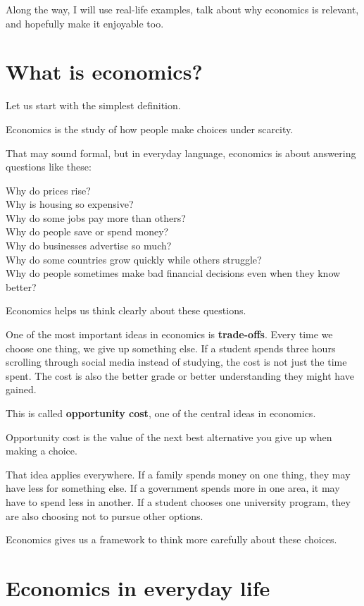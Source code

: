 \documentclass[12pt]{article}
\begin{document}
Along the way, I will use real-life examples, talk about why economics is relevant, and hopefully make it enjoyable too.

\section*{What is economics?}

Let us start with the simplest definition.

Economics is the study of how people make choices under scarcity.

That may sound formal, but in everyday language, economics is about answering questions like these:

Why do prices rise?\\
Why is housing so expensive?\\
Why do some jobs pay more than others?\\
Why do people save or spend money?\\
Why do businesses advertise so much?\\
Why do some countries grow quickly while others struggle?\\
Why do people sometimes make bad financial decisions even when they know better?

Economics helps us think clearly about these questions.

One of the most important ideas in economics is \textbf{trade-offs}. Every time we choose one thing, we give up something else. If a student spends three hours scrolling through social media instead of studying, the cost is not just the time spent. The cost is also the better grade or better understanding they might have gained.

This is called \textbf{opportunity cost}, one of the central ideas in economics.

Opportunity cost is the value of the next best alternative you give up when making a choice.

That idea applies everywhere. If a family spends money on one thing, they may have less for something else. If a government spends more in one area, it may have to spend less in another. If a student chooses one university program, they are also choosing not to pursue other options.

Economics gives us a framework to think more carefully about these choices.

\section*{Economics in everyday life}
\end{document}
